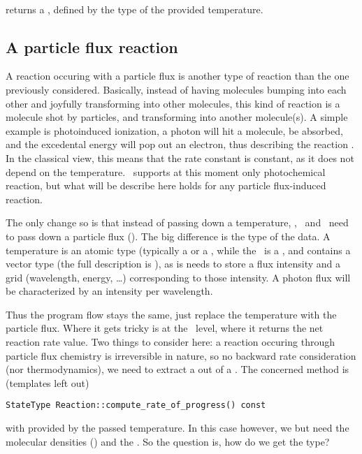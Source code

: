\paragraph{\KineticsType} returns a , defined by the type of the
provided temperature.

\subsection{A particle flux reaction}

A reaction occuring with a particle flux is another type of reaction than the one
previously considered. Basically, instead of having molecules bumping into each
other and joyfully transforming into other molecules, this kind of reaction is
a molecule shot by particles, and transforming into another molecule(s). A simple
example is photoinduced ionization, a photon will hit a molecule, be absorbed, and
the excedental energy will pop out an electron, thus describing the reaction
. In the classical view, this means that the rate constant
is constant, as it does not depend on the temperature. \Antioch\ supports at this
moment only photochemical reaction, but what will be describe here holds for any
particle flux-induced reaction.

The only change so is that instead of passing down a temperature, \KineticsEvaluator,
\ReactionSet\ and \Reaction\ need to pass down a particle flux (\ParticleFlux). The
big difference is the type of the data. A temperature is an atomic type (typically
a  or a , while the \ParticleFlux\ is a \ParticleFlux, and
contains a vector type (the full description is \ParticleFlux{}),
as is needs to store a flux intensity and a grid (wavelength, energy, \dots) corresponding
to those intensity. A photon flux will be characterized by an intensity per wavelength.

Thus the program flow stays the same, just replace the temperature with the particle
flux. Where it gets tricky is at the \Reaction\ level, where it returns the net reaction
rate value. Two things to consider here: a reaction occuring through particle flux
chemistry is irreversible in nature, so no backward rate consideration (nor thermodynamics),
we need to extract a  out of a \ParticleFlux{}.
The concerned method is (templates left out)
\begin{center}
\verb!StateType Reaction::compute_rate_of_progress() const!
\end{center}
with  provided by the passed temperature. In this case however, we but
need the molecular densities () and the \ParticleFlux. So the
question is, how do we get the  type?

